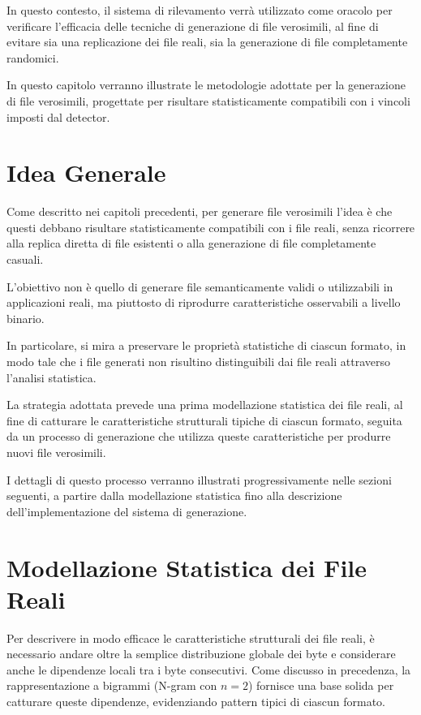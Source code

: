 \documentclass{report}
\begin{document}
\bigskip

In questo contesto, il sistema di rilevamento verrà utilizzato come oracolo per verificare l'efficacia
delle tecniche di generazione di file verosimili, al fine di
evitare sia una replicazione dei file reali, sia la generazione di file completamente randomici.

In questo capitolo verranno illustrate le metodologie adottate per la generazione di file verosimili,
progettate per risultare statisticamente compatibili con i vincoli imposti dal detector.

\section{Idea Generale}

Come descritto nei capitoli precedenti, per generare file verosimili l'idea è che questi
debbano risultare statisticamente compatibili con i file reali, senza ricorrere
alla replica diretta di file esistenti o alla generazione di file completamente casuali.

\bigskip

L'obiettivo non è quello di generare file semanticamente validi o utilizzabili in applicazioni reali,
ma piuttosto di riprodurre caratteristiche osservabili a livello binario.

In particolare, si mira a preservare le proprietà statistiche di ciascun formato, in modo tale
che i file generati non risultino distinguibili dai file reali attraverso l'analisi statistica.

\bigskip

La strategia adottata prevede una prima modellazione statistica dei file reali, al fine 
di catturare le caratteristiche strutturali tipiche di ciascun formato, seguita 
da un processo di generazione che utilizza queste caratteristiche per produrre nuovi file verosimili.

\bigskip

I dettagli di questo processo verranno illustrati progressivamente nelle sezioni seguenti, a partire dalla modellazione statistica
fino alla descrizione dell'implementazione del sistema di generazione.

\section{Modellazione Statistica dei File Reali}

Per descrivere in modo efficace le caratteristiche strutturali dei file reali, è necessario
andare oltre la semplice distribuzione globale dei byte e considerare anche le dipendenze locali tra i byte consecutivi.
Come discusso in precedenza, la rappresentazione a bigrammi (N-gram con \(n=2\)) fornisce una base solida per catturare 
queste dipendenze, evidenziando pattern tipici di ciascun formato.
\end{document}

